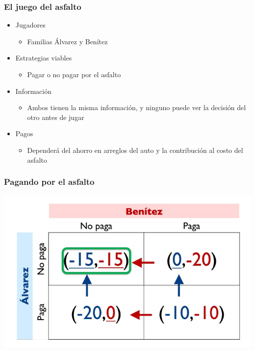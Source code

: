 \documentclass{beamer}
\begin{document}
\begin{frame}
\frametitle{ El juego del asfalto}
\begin{itemize}
    \item Jugadores
        \begin{itemize}
        \item Familias Álvarez y Benítez
        \end{itemize}
    \item Estrategias viables
        \begin{itemize}
        \item Pagar o no pagar por el asfalto
        \end{itemize}
    \item Información
        \begin{itemize}
        \item Ambos tienen la misma información, y ninguno puede ver la decisión del otro antes de jugar
        \end{itemize}
    \item Pagos
        \begin{itemize}
        \item Dependerá del ahorro en arreglos del auto y la contribución al costo del asfalto
        \end{itemize}
\end{itemize}
\end{frame}

\begin{frame}
\frametitle{ Pagando por el asfalto}
\centering
\includegraphics[scale=0.6]{Slides Principios de Economia/Figures/Tema_03_27_abel.jpg}
\end{frame}
\end{document}
